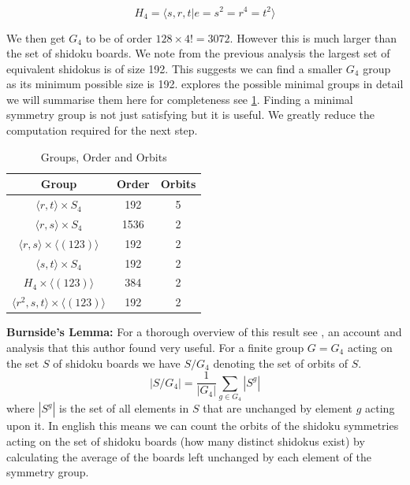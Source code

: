 \documentclass[a4paper,11pt]{report}
\begin{document}
{\begin{equation}H_4 = \langle s,r,t | e=s^2=r^4=t^2\rangle\end{equation}

We then get $G_4$ to be of order $128\times 4!=3072$. However this is much larger than the set of shidoku boards. We note from the previous analysis the largest set of equivalent shidokus is of size 192. This suggests we can find a smaller $G_4$ group as its minimum possible size is 192. \cite{} explores the possible minimal groups in detail we will summarise them here for completeness see \ref{table:group}. Finding a minimal symmetry group is not just satisfying but it is useful. We greatly reduce the computation required for the next step.

\begin{table}[!h]
\begin{center}
\begin{tabular}{ |c|c|c| }
 \hline
Group & Order & Orbits\\
 \hline
 $\langle r,t \rangle \times S_4$ & 192 & 5\\
 $\langle r,s \rangle \times S_4$ & 1536 & 2\\
 $\langle r,s \rangle \times \langle (123)\rangle$ & 192 & 2\\
 $\langle s,t \rangle \times S_4$ & 192 & 2\\
 $H_4 \times\langle (123) \rangle $ & 384 & 2\\
 $\langle r^2,s,t \rangle \times \langle (123) \rangle$ & 192 & 2\\
 \hline
\end{tabular}
\end{center}
\caption{\label{table:group}Groups, Order and Orbits}
\end{table}

\textbf{Burnside's Lemma:} For a thorough overview of this result see \cite{analysis and applications of burnsides lemma jenny jin}, an account and analysis that this author found very useful. For a finite group $G=G_4$ acting on the set $S$ of shidoku boards we have $S/G_4$ denoting the set of orbits of $S$. 
\begin{equation} |S/G_4|=\frac{1}{|G_4|}\sum_{g\in G_4}|S^g|\end{equation}
where $|S^g|$ is the set of all elements in $S$ that are unchanged by element $g$ acting upon it. In english this means we can count the orbits of the shidoku symmetries acting on the set of shidoku boards (how many distinct shidokus exist) by calculating the average of the boards left unchanged by each element of the symmetry group. 

}
\end{document}
